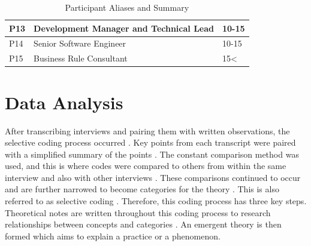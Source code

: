 \begin{table}[!hb]
\begin{tabular}{|l|l|l|}
\multicolumn{1}{|l|}{P13}          & \multicolumn{1}{l|}{Development Manager and Technical Lead} & \multicolumn{1}{l|}{10-15}                      \\ \hline
\multicolumn{1}{|l|}{P14}          & \multicolumn{1}{l|}{Senior Software Engineer}               & \multicolumn{1}{l|}{10-15}                      \\ \hline
P15                                & Business Rule Consultant                                    & 15\textless{}                                   \\ \hline
\end{tabular}
\centering
\caption{Participant Aliases and Summary}
\centering
\end{table}

\section{Data Analysis} 

After transcribing interviews and pairing them with written observations, the selective coding process occurred \cite{geeks}. Key points from each transcript were paired with a simplified summary of the points \cite{geeks}. The constant comparison method was used, and this is where codes were compared to others from within the same interview and also with other interviews \cite{geeks}. These comparisons continued to occur and are further narrowed to become categories for the theory \cite{geeks}. This is also referred to as selective coding \cite{geeks}. Therefore, this coding process has three key steps. Theoretical notes are written throughout this coding process to research relationships between concepts and categories \cite{geeks}. An emergent theory is then formed which aims to explain a practice or a phenomenon. 








